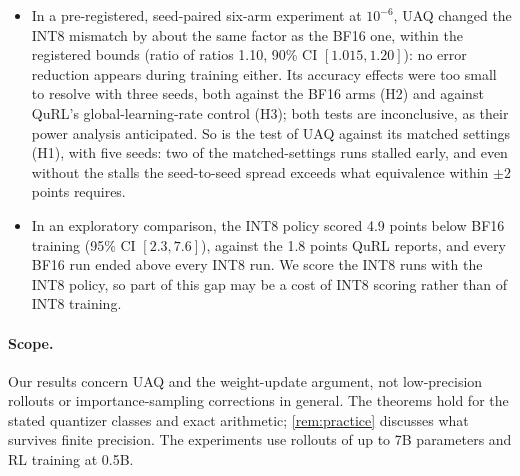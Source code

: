 \begin{enumerate}[leftmargin=*,itemsep=2pt]
\begin{itemize}[leftmargin=*,itemsep=1pt]
  \item In a pre-registered, seed-paired six-arm experiment at $10^{-6}$, UAQ changed the INT8 mismatch by about the same factor as the BF16 one, within the registered bounds (ratio of ratios 1.10, 90\% CI $[1.015, 1.20]$): no error reduction appears during training either. Its accuracy effects were too small to resolve with three seeds, both against the BF16 arms (H2) and against QuRL's global-learning-rate control (H3); both tests are inconclusive, as their power analysis anticipated. So is the test of UAQ against its matched settings (H1), with five seeds: two of the matched-settings runs stalled early, and even without the stalls the seed-to-seed spread exceeds what equivalence within $\pm2$ points requires.
  \item In an exploratory comparison, the INT8 policy scored 4.9 points below BF16 training (95\% CI $[2.3, 7.6]$), against the 1.8 points QuRL reports, and every BF16 run ended above every INT8 run. We score the INT8 runs with the INT8 policy, so part of this gap may be a cost of INT8 scoring rather than of INT8 training.
  \end{itemize}
\end{enumerate}

\paragraph{Scope.} Our results concern UAQ and the weight-update argument, not low-precision rollouts or importance-sampling corrections in general. The theorems hold for the stated quantizer classes and exact arithmetic; \cref{rem:practice} discusses what survives finite precision. The experiments use rollouts of up to 7B parameters and RL training at 0.5B.
